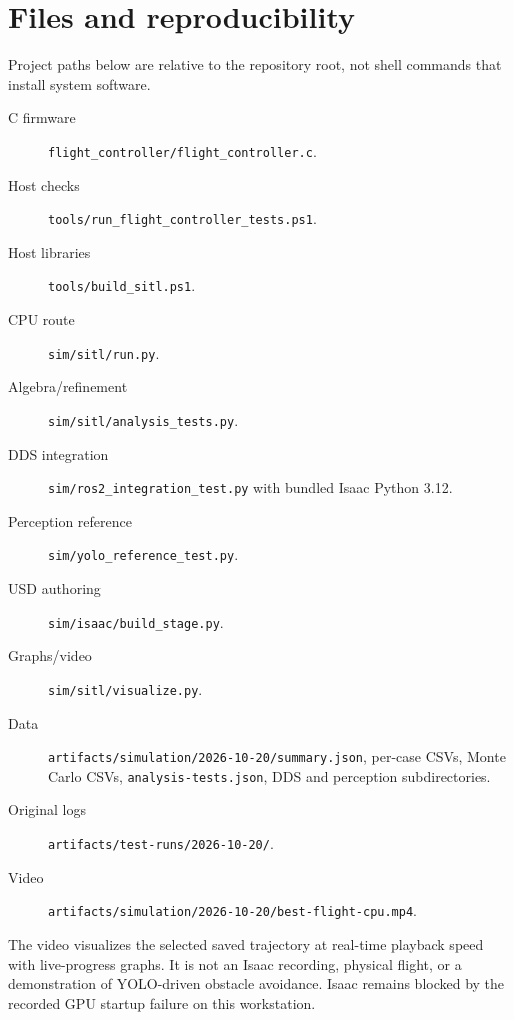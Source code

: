 \section{Files and reproducibility}
Project paths below are relative to the repository root, not shell commands
that install system software.
\begin{description}
\item[C firmware] \texttt{flight\_controller/flight\_controller.c}.
\item[Host checks] \texttt{tools/run\_flight\_controller\_tests.ps1}.
\item[Host libraries] \texttt{tools/build\_sitl.ps1}.
\item[CPU route] \texttt{sim/sitl/run.py}.
\item[Algebra/refinement] \texttt{sim/sitl/analysis\_tests.py}.
\item[DDS integration] \texttt{sim/ros2\_integration\_test.py} with bundled Isaac Python 3.12.
\item[Perception reference] \texttt{sim/yolo\_reference\_test.py}.
\item[USD authoring] \texttt{sim/isaac/build\_stage.py}.
\item[Graphs/video] \texttt{sim/sitl/visualize.py}.
\item[Data] \texttt{artifacts/simulation/2026-10-20/summary.json}, per-case CSVs,
Monte Carlo CSVs, \texttt{analysis-tests.json}, DDS and perception subdirectories.
\item[Original logs] \texttt{artifacts/test-runs/2026-10-20/}.
\item[Video] \texttt{artifacts/simulation/2026-10-20/best-flight-cpu.mp4}.
\end{description}
The video visualizes the selected saved trajectory at real-time playback speed
with live-progress graphs. It is not an Isaac recording, physical flight,
or a demonstration of YOLO-driven obstacle avoidance. Isaac remains blocked
by the recorded GPU startup failure on this workstation.
